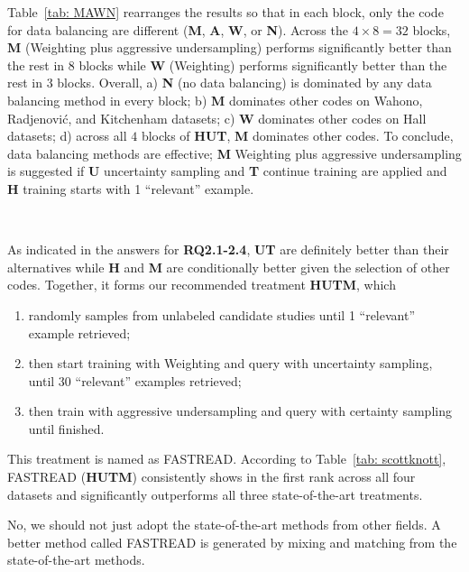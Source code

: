 \documentclass{svjour3}
\theoremstyle{break}
\newcommand{\respto}[1]{
\fcolorbox{black}{black!15}{
\label{response:#1}
\bf
  \scriptsize R-{#1}}~
}
\begin{document}
Table~\ref{tab: MAWN} rearranges the results so that in each block, only the code for data balancing are different (\textbf{M}, \textbf{A}, \textbf{W}, or \textbf{N}). Across the $4\times 8 = 32$ blocks, \textbf{M} (Weighting plus aggressive undersampling) performs significantly better than the rest in 8 blocks while \textbf{W} (Weighting) performs significantly better than the rest in 3 blocks. Overall, a) \textbf{N} (no data balancing) is dominated by any data balancing method in every block; b) \textbf{M} dominates other codes on Wahono, Radjenovi{\'c}, and Kitchenham datasets; c) \textbf{W} dominates other codes on Hall datasets; d) across all $4$ blocks of \textbf{HUT}, \textbf{M} dominates other codes. To conclude, data balancing methods are effective; \textbf{M} Weighting plus aggressive undersampling is suggested if \textbf{U} uncertainty sampling and \textbf{T} continue training are applied and \textbf{H} training starts with 1 ``relevant'' example.

\respto{1a2}
As indicated in the answers for \textbf{RQ2.1-2.4}, \textbf{UT} are definitely better than their alternatives while \textbf{H} and \textbf{M} are conditionally better given the selection of other codes. Together, it forms our recommended treatment \textbf{HUTM}, which 
\begin{enumerate}
\item
randomly samples from unlabeled candidate studies until 1 ``relevant'' example retrieved;
\item
then start training with Weighting and query with uncertainty sampling, until 30 ``relevant'' examples retrieved;
\item
then train with aggressive undersampling and query with certainty sampling until finished.
\end{enumerate}

This treatment is named as FASTREAD. According to Table~\ref{tab: scottknott}, FASTREAD (\textbf{HUTM}) consistently shows in the first rank across all four datasets and significantly outperforms all three state-of-the-art treatments.

\begin{lesson}
    No, we should not just adopt the state-of-the-art methods from other fields. A better method called FASTREAD is generated by mixing and matching from the state-of-the-art methods.
\end{lesson}
\end{document}
